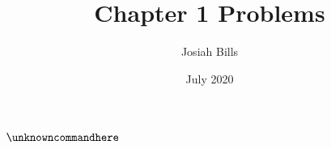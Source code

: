 \documentclass{article}
\title{Chapter 1 Problems}
\author{Josiah Bills}
\date{July 2020}
\begin{document}
\maketitle

$\unknowncommandhere$
\end{document}
